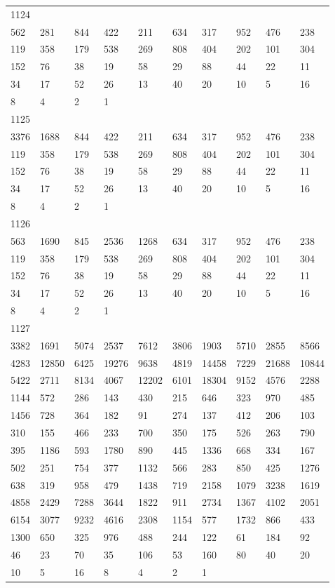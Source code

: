 \begin{longtable}{*{10}{l}}
1124&&&&&&&&&\\
562& 281& 844& 422& 211& 634& 317& 952& 476& 238\\
119& 358& 179& 538& 269& 808& 404& 202& 101& 304\\
152& 76& 38& 19& 58& 29& 88& 44& 22& 11\\
34& 17& 52& 26& 13& 40& 20& 10& 5& 16\\
8& 4& 2& 1& \\

1125&&&&&&&&&\\
3376& 1688& 844& 422& 211& 634& 317& 952& 476& 238\\
119& 358& 179& 538& 269& 808& 404& 202& 101& 304\\
152& 76& 38& 19& 58& 29& 88& 44& 22& 11\\
34& 17& 52& 26& 13& 40& 20& 10& 5& 16\\
8& 4& 2& 1& \\

1126&&&&&&&&&\\
563& 1690& 845& 2536& 1268& 634& 317& 952& 476& 238\\
119& 358& 179& 538& 269& 808& 404& 202& 101& 304\\
152& 76& 38& 19& 58& 29& 88& 44& 22& 11\\
34& 17& 52& 26& 13& 40& 20& 10& 5& 16\\
8& 4& 2& 1& \\

1127&&&&&&&&&\\
3382& 1691& 5074& 2537& 7612& 3806& 1903& 5710& 2855& 8566\\
4283& 12850& 6425& 19276& 9638& 4819& 14458& 7229& 21688& 10844\\
5422& 2711& 8134& 4067& 12202& 6101& 18304& 9152& 4576& 2288\\
1144& 572& 286& 143& 430& 215& 646& 323& 970& 485\\
1456& 728& 364& 182& 91& 274& 137& 412& 206& 103\\
310& 155& 466& 233& 700& 350& 175& 526& 263& 790\\
395& 1186& 593& 1780& 890& 445& 1336& 668& 334& 167\\
502& 251& 754& 377& 1132& 566& 283& 850& 425& 1276\\
638& 319& 958& 479& 1438& 719& 2158& 1079& 3238& 1619\\
4858& 2429& 7288& 3644& 1822& 911& 2734& 1367& 4102& 2051\\
6154& 3077& 9232& 4616& 2308& 1154& 577& 1732& 866& 433\\
1300& 650& 325& 976& 488& 244& 122& 61& 184& 92\\
46& 23& 70& 35& 106& 53& 160& 80& 40& 20\\
10& 5& 16& 8& 4& 2& 1& \\


\end{longtable}
